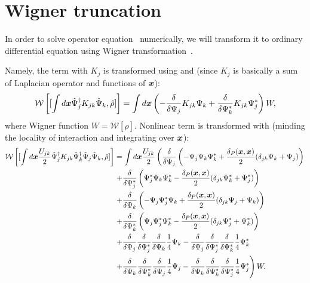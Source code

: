 \section{Wigner truncation}

In order to solve operator equation~ numerically,
we will transform it to ordinary differential equation using Wigner transformation~.

Namely, the term with $K_j$ is transformed using  and 
(since $K_j$ is basically a sum of Laplacian operator and functions of $\boldsymbol{x}$):
\[
	\mathcal{W} \left[ [ \int d\boldsymbol{x} \hat{\Psi}_j^\dagger K_{jk} \hat{\Psi}_k, \hat{\rho} ] \right]
	= \int d\boldsymbol{x} \left(
			- \frac{\delta}{\delta \Psi_j} K_{jk} \Psi_k
			+ \frac{\delta}{\delta \Psi_k^*} K_{jk} \Psi_j^*
		\right)
		W,
\]
where Wigner function $W = \mathcal{W}[\hat{\rho}]$.
Nonlinear term is transformed with 
(minding the locality of interaction and integrating over $\boldsymbol{x}$):
\begin{equation*}
\begin{split}
	\mathcal{W} \left[
		[
			\int d\boldsymbol{x} \frac{U_{jk}}{2}
				\hat{\Psi}_j^\dagger K_{jk} \hat{\Psi}_k^\dagger \hat{\Psi}_j \hat{\Psi}_k,
			\hat{\rho}
		]
	\right]
	& = \int d\boldsymbol{x} \frac{U_{jk}}{2} \left(
		\frac{\delta}{\delta \Psi_j} \left(
			- \Psi_j \Psi_k \Psi_k^*
			+ \frac{\delta_P(\boldsymbol{x}, \boldsymbol{x})}{2} ( \delta_{jk} \Psi_k + \Psi_j )
		\right) \right. \\
	&	\left. + \frac{\delta}{\delta \Psi_j^*} \left(
			\Psi_j^* \Psi_k \Psi_k^*
			- \frac{\delta_P(\boldsymbol{x}, \boldsymbol{x})}{2} ( \delta_{jk} \Psi_k^* + \Psi_j^* )
		\right) \right. \\
	&	\left. + \frac{\delta}{\delta \Psi_k} \left(
			- \Psi_j \Psi_j^* \Psi_k
			+ \frac{\delta_P(\boldsymbol{x}, \boldsymbol{x})}{2} ( \delta_{jk} \Psi_j + \Psi_k )
		\right) \right. \\
	&	\left. + \frac{\delta}{\delta \Psi_k^*} \left(
			\Psi_j \Psi_j^* \Psi_k^*
			- \frac{\delta_P(\boldsymbol{x}, \boldsymbol{x})}{2} ( \delta_{jk} \Psi_j^* + \Psi_k^* )
		\right) \right. \\
	&	\left.
			+ \frac{\delta}{\delta \Psi_j}
			\frac{\delta}{\delta \Psi_j^*}
			\frac{\delta}{\delta \Psi_k}
			\frac{1}{4} \Psi_k
			- \frac{\delta}{\delta \Psi_j}
			\frac{\delta}{\delta \Psi_j^*}
			\frac{\delta}{\delta \Psi_k^*}
			\frac{1}{4} \Psi_k^*
		\right. \\
	&	\left.
			+ \frac{\delta}{\delta \Psi_k}
			\frac{\delta}{\delta \Psi_k^*}
			\frac{\delta}{\delta \Psi_j}
			\frac{1}{4} \Psi_j
			- \frac{\delta}{\delta \Psi_k}
			\frac{\delta}{\delta \Psi_k^*}
			\frac{\delta}{\delta \Psi_j^*}
			\frac{1}{4} \Psi_j^*
		\right) W.
\end{split}
\end{equation*}
